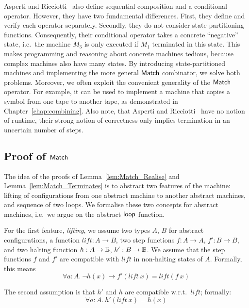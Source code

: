 Asperti and Ricciotti~\cite{asperti2015} also define sequential composition and a conditional operator.  However, they have two fundamental
differences.  First, they define and verify each operator separately.  Secondly, they do not consider state partitioning functions.  Consequently,
their conditional operator takes a concrete ``negative'' state, i.e.\ the machine $M_3$ is only executed if $M_1$ terminated in this state.  This
makes programming and reasoning about concrete machines tedious, because complex machines also have many states.  By introducing state-partitioned
machines and implementing the more general $\mathsf{Match}$ combinator, we solve both problems.  Moreover, we often exploit the convenient generality of the
$\mathsf{Match}$ operator.  For example, it can be used to implement a machine that copies a symbol from one tape to another tape, as demonstrated in
Chapter~\ref{chap:combining}.  Also note, that Asperti and Ricciotti~\cite{asperti2015} have no notion of runtime, their strong notion of correctness
only implies termination in an uncertain number of steps.


\subsection{Proof of $\mathsf{Match}$}
\label{sec:match-proofs}


The idea of the proofs of Lemma~\ref{lem:Match_Realise} and Lemma~\ref{lem:Match_Terminates} is to abstract two features of the machine: lifting of
configurations from one abstract machine to another abstract machines, and sequence of two loops.  We formalise these two concepts for abstract
machines, i.e.\ we argue on the abstract $\mathsf{loop}$ function.

For the first feature, \emph{lifting}, we assume two types $A$, $B$ for abstract configurations, a function $lift : A \to B$, two step functions
$f : A \to A$, $f' : B \to B$, and two halting function $h : A \rightarrow \mathbb{B}$, $h' : B \rightarrow \mathbb{B}$.  We assume that the step functions $f$ and $f'$ are
compatible with $lift$ in non-halting states of $A$.  Formally, this means
\begin{equation}
  \label{eq:loop_lift_assumption1}
  \forall a:A.~\lnot h(x) \rightarrow f' (lift~x) = lift (f~x)
\end{equation}

The second assumption is that $h'$ and $h$ are compatible w.r.t.\ $lift$; formally:
\begin{equation}
  \label{eq:loop_lift_assumption2}
  \forall a:A.~h'(lift~x)=h(x)
\end{equation}

